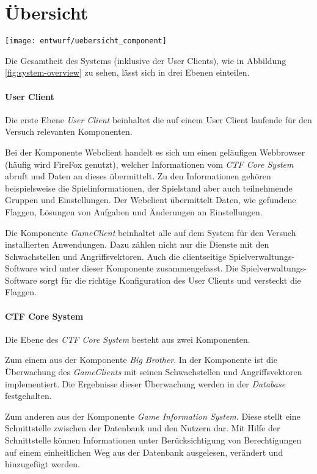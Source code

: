 \section{Übersicht} \label{sec:Übersicht}
\begin{center}
	\texttt{[image: entwurf/uebersicht\_component]}
	\label{fig:system-overview}
\end{center}

Die Gesamtheit des Systems (inklusive der User Clients), wie in Abbildung \ref{fig:system-overview} zu sehen, lässt sich in drei Ebenen einteilen.

\paragraph{User Client}
Die erste Ebene \textit{User Client} beinhaltet die auf einem User Client laufende für den Versuch relevanten Komponenten.

Bei der Komponente Webclient handelt es sich um einen geläufigen Webbrowser (häufig wird FireFox genutzt), welcher Informationen vom \textit{CTF Core System} abruft und Daten an dieses übermittelt.
Zu den Informationen gehören beispielsweise die Spielinformationen, der Spielstand aber auch teilnehmende Gruppen und Einstellungen. Der Webclient übermittelt Daten, wie gefundene Flaggen, Lösungen von Aufgaben und Änderungen an Einstellungen.

Die Komponente \textit{GameClient} beinhaltet alle auf dem System für den Versuch installierten Anwendungen. Dazu zählen nicht nur die Dienste mit den Schwachstellen und Angriffsvektoren. Auch die clientseitige Spielverwaltungs-Software wird unter dieser Komponente zusammengefasst. Die Spielverwaltungs-Software sorgt für die richtige Konfiguration des User Clients und versteckt die Flaggen.

\paragraph{CTF Core System}
Die Ebene des \textit{CTF Core System} besteht aus zwei Komponenten. 

Zum einem aus der Komponente \textit{Big Brother}. In der Komponente ist die Überwachung des \textit{GameClients} mit seinen Schwachstellen und Angriffsvektoren implementiert. Die Ergebnisse dieser Überwachung werden in der \textit{Database} festgehalten.

Zum anderen aus der Komponente \textit{Game Information System}. Diese stellt eine Schnittstelle zwischen der Datenbank und den Nutzern dar. Mit Hilfe der Schnittstelle können Informationen unter Berücksichtigung von Berechtigungen auf einem einheitlichen Weg aus der Datenbank ausgelesen, verändert und hinzugefügt werden. 

